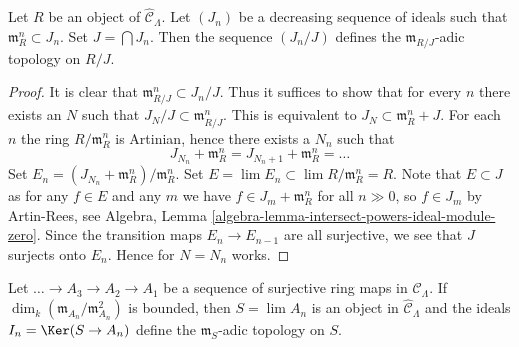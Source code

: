 \begin{lemma}
\label{lemma-m-adic-topology}
Let $R$ be an object of $\widehat{\mathcal{C}}_\Lambda$. Let $(J_n)$ be a
decreasing sequence of ideals such that $\mathfrak m_R^n \subset J_n$.
Set $J = \bigcap J_n$. Then the sequence $(J_n/J)$ defines the
$\mathfrak m_{R/J}$-adic topology on $R/J$.
\end{lemma}

\begin{proof}
It is clear that $\mathfrak m_{R/J}^n \subset J_n/J$. Thus it suffices
to show that for every $n$ there exists an $N$ such that
$J_N/J \subset \mathfrak m_{R/J}^n$. This is equivalent to
$J_N \subset \mathfrak m_R^n + J$. For each $n$ the ring $R/\mathfrak m_R^n$
is Artinian, hence there exists a $N_n$ such that
$$
J_{N_n} + \mathfrak m_R^n = J_{N_n + 1} + \mathfrak m_R^n = \ldots
$$
Set $E_n = (J_{N_n} + \mathfrak m_R^n)/\mathfrak m_R^n$.
Set $E = \lim E_n \subset \lim R/\mathfrak m_R^n = R$.
Note that $E \subset J$ as for any $f \in E$ and any $m$
we have $f \in J_m + \mathfrak m_R^n$ for all $n \gg 0$, so
$f \in J_m$ by Artin-Rees, see
Algebra, Lemma \ref{algebra-lemma-intersect-powers-ideal-module-zero}.
Since the transition maps $E_n \to E_{n - 1}$ are all surjective,
we see that $J$ surjects onto $E_n$. Hence for $N = N_n$ works.
\end{proof}

\begin{lemma}
\label{lemma-limit-artinian}
Let $\ldots \to A_3 \to A_2 \to A_1$ be a sequence of surjective
ring maps in $\mathcal{C}_\Lambda$. If
$\dim_k (\mathfrak m_{A_n}/\mathfrak m_{A_n}^2)$ is bounded, then
$S = \lim A_n$ is an object in $\widehat{\mathcal{C}}_\Lambda$
and the ideals $I_n = \Ker(S \to A_n)$ define the
$\mathfrak m_S$-adic topology on $S$.
\end{lemma}

